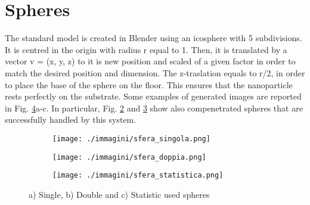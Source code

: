 \section{Spheres}

The standard model is created in Blender using an icosphere with 5 subdivisions. It is centred in the origin with radius r equal to 1.
Then, it is translated by a vector v = (x, y, z) to it is new position and scaled of a given factor in order to match the desired position and dimension. The z-traslation equals to r/2, in order to place the base of the sphere on the floor. This ensures that the nanoparticle rests perfectly on the substrate.
Some examples of generated images are reported in Fig. \ref{fig:sphere}a-c. In particular, Fig. \ref{fig:sphere_b} and \ref{fig:sphere_c} show also compenetrated spheres that are successfully handled by this system.

\begin{figure}[ht]
    \centering
    \begin{subfigure}[b]{0.32\textwidth}
        \texttt{[image: ./immagini/sfera\_singola.png]}
        \caption{}
        \label{fig:sphere_a}
    \end{subfigure}
    \hfill
    \begin{subfigure}[b]{0.32\textwidth}
        \texttt{[image: ./immagini/sfera\_doppia.png]}
        \caption{}
        \label{fig:sphere_b}
    \end{subfigure}
    \hfill
    \begin{subfigure}[b]{0.32\textwidth}
        \texttt{[image: ./immagini/sfera\_statistica.png]}
        \caption{}
        \label{fig:sphere_c}
    \end{subfigure}
    \caption{a) Single, b) Double and  c) Statistic used spheres}
    \label{fig:sphere}
\end{figure}